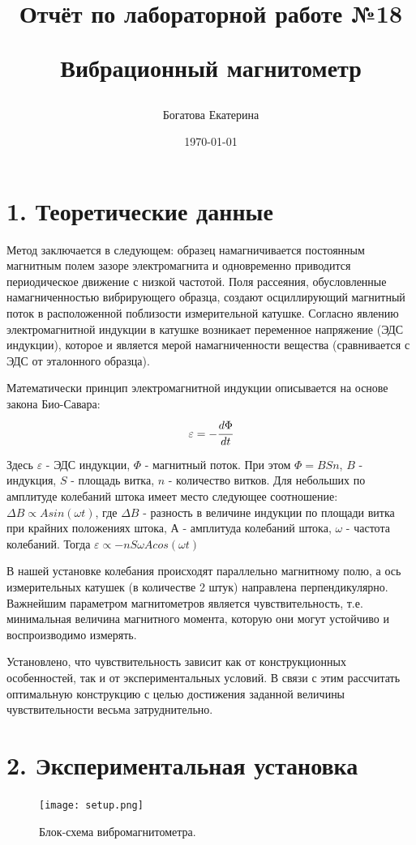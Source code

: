 \documentclass[a4paper,12pt]{report}
\title{Отчёт по лабораторной работе №18

Вибрационный магнитометр}
\author{Богатова Екатерина}
\date{\today}
\begin{document}
\maketitle


\section*{1. Теоретические данные}

Метод заключается в следующем: образец намагничивается постоянным магнитным полем зазоре электромагнита и одновременно приводится периодическое движение с низкой частотой. Поля рассеяния, обусловленные намагниченностью вибрирующего образца, создают осциллирующий магнитный поток в расположенной поблизости измерительной катушке. Согласно явлению электромагнитной индукции в катушке возникает переменное напряжение (ЭДС индукции), которое и является мерой намагниченности вещества (сравнивается с ЭДС от эталонного образца). 

Математически принцип электромагнитной индукции описывается на основе закона Био-Савара:
\[ \varepsilon = -\cfrac{d\Phi}{dt}\]

Здесь $\varepsilon$ - ЭДС индукции, $\Phi$ - магнитный поток. При этом $\Phi = BSn$, $B$ - индукция, $S$ - площадь витка, $n$ - количество витков. Для небольших по амплитуде колебаний штока имеет место следующее соотношение: $\Delta B \propto A sin( \omega t)$, где $\Delta B$ - разность в величине индукции по площади витка при крайних положениях штока, $А$ - амплитуда колебаний штока, $\omega$ - частота колебаний. Тогда $\varepsilon \propto -n S \omega A cos( \omega t)$

В нашей установке колебания происходят параллельно магнитному полю, а ось измерительных катушек (в количестве 2 штук) направлена перпендикулярно. Важнейшим параметром магнитометров является чувствительность, т.е. минимальная величина магнитного момента, которую они могут устойчиво и воспроизводимо измерять.

Установлено, что чувствительность зависит как от конструкционных особенностей,
так и от экспериментальных условий. В связи с этим рассчитать оптимальную конструкцию с целью достижения заданной величины чувствительности весьма затруднительно.

\section*{2. Экспериментальная установка}
\begin{figure}[H]
    \centering
    \texttt{[image: setup.png]}
    \caption{Блок-схема вибромагнитометра.} \label{ustanovka}
\end{figure}
\end{document}
